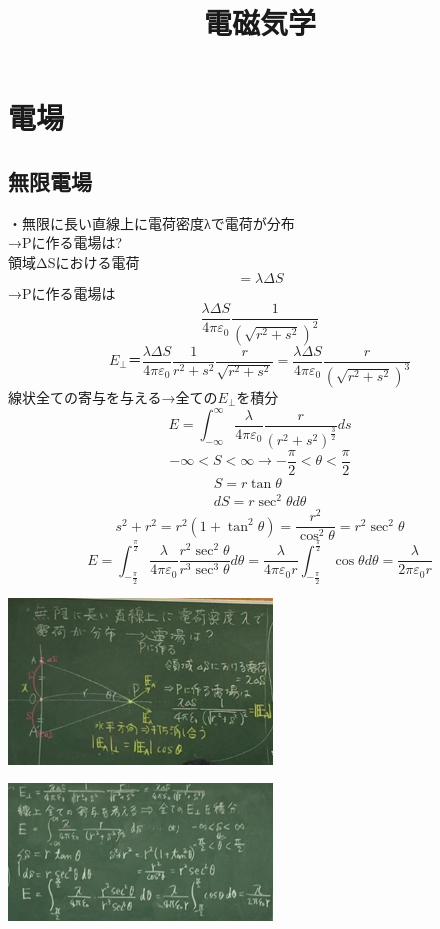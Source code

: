 \documentclass{jsarticle}
\title{電磁気学}
\begin{document}
\section{電場}
	\subsection{無限電場}
		・無限に長い直線上に電荷密度λで電荷が分布\\
		→Pに作る電場は?\\
		領域ΔSにおける電荷\\
		\[
			=\lambda \Delta S
		\]
		→Pに作る電場は
		\[
			\frac{\lambda \Delta S}{4\pi \varepsilon_0}\frac{1}{(\sqrt{r^2+s^2})^2}
		\]
		\[
			E_\perp ＝\frac{\lambda \Delta S}{4\pi \varepsilon_0}\frac{1}{r^2+s^2}\frac{r}{\sqrt{r^2+s^2}}=\frac{\lambda \Delta S}{4\pi \varepsilon_0}\frac{r}{(\sqrt{r^2+s^2})^3}
		\]
		線状全ての寄与を与える→全ての$E_\perp$を積分
		\[
			E=\int^\infty_{-\infty} \frac{\lambda}{4 \pi \varepsilon_0} \frac{r}{(r^2+s^2)^{\frac{3}{2}}} ds
		\]
		\[
			-\infty<S<\infty → -\frac{\pi}{2}<\theta <\frac{\pi}{2}
		\]
		\begin{eqnarray}
			S=r\tan \theta \\
			dS=r\sec^2\theta d\theta
		\end{eqnarray}
		\[
			s^2+r^2=r^2(1+\tan^2 \theta)=\frac{r^2}{\cos^2\theta}=r^2\sec^2\theta
		\]
		\[
			E=\int^{\frac{\pi}{2}}_{-\frac{\pi}{2}}\frac{\lambda}{4\pi\varepsilon_0}\frac{r^2\sec^2\theta}{r^3\sec^3\theta}d\theta=\frac{\lambda}{4 \pi \varepsilon_0r}\int^{\frac{\pi}{2}}_{-\frac{\pi}{2}}\cos\theta d\theta=\frac{\lambda}{2 \pi \varepsilon_0r}
		\]
		\begin{minipage}{0.5\hsize}	
		\begin{center}
			\includegraphics[width=7cm]{5_10_1.JPG}
		\end{center}
		\end{minipage}
		\begin{minipage}{0.5\hsize}	
		\begin{center}
			\includegraphics[width=7cm]{5_10_2.JPG}
		\end{center}
		\end{minipage}
\end{document}
